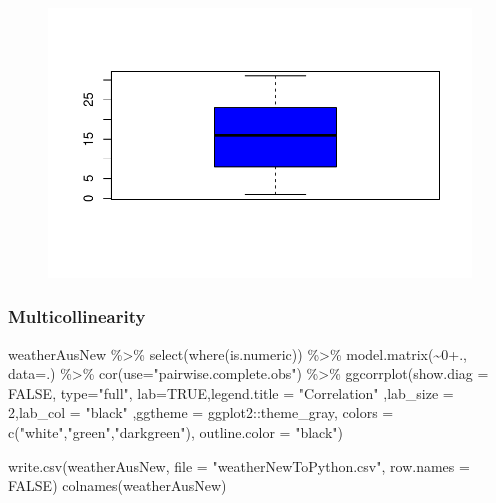 \documentclass[
  letterpaper,
  DIV=11,
  numbers=noendperiod]{scrartcl}
\newenvironment{Shaded}{\begin{snugshade}}{\end{snugshade}}
\newcommand{\AttributeTok}[1]{\textcolor[rgb]{0.40,0.45,0.13}{#1}}
\newcommand{\ConstantTok}[1]{\textcolor[rgb]{0.56,0.35,0.01}{#1}}
\newcommand{\DecValTok}[1]{\textcolor[rgb]{0.68,0.00,0.00}{#1}}
\newcommand{\FunctionTok}[1]{\textcolor[rgb]{0.28,0.35,0.67}{#1}}
\newcommand{\NormalTok}[1]{\textcolor[rgb]{0.00,0.23,0.31}{#1}}
\newcommand{\OtherTok}[1]{\textcolor[rgb]{0.00,0.23,0.31}{#1}}
\newcommand{\SpecialCharTok}[1]{\textcolor[rgb]{0.37,0.37,0.37}{#1}}
\newcommand{\StringTok}[1]{\textcolor[rgb]{0.13,0.47,0.30}{#1}}
\begin{document}
\begin{figure}[H]

{\centering \includegraphics{RainAus_EDA_files/figure-pdf/unnamed-chunk-28-1.pdf}

}

\end{figure}

\hypertarget{multicollinearity}{%
\subsubsection{Multicollinearity}\label{multicollinearity}}

\begin{Shaded}
\begin{Highlighting}[]
\NormalTok{weatherAusNew }\SpecialCharTok{\%\textgreater{}\%} \FunctionTok{select}\NormalTok{(}\FunctionTok{where}\NormalTok{(is.numeric)) }\SpecialCharTok{\%\textgreater{}\%} \FunctionTok{model.matrix}\NormalTok{(}\SpecialCharTok{\textasciitilde{}}\DecValTok{0}\SpecialCharTok{+}\NormalTok{.,}
              \AttributeTok{data=}\NormalTok{.) }\SpecialCharTok{\%\textgreater{}\%}
    \FunctionTok{cor}\NormalTok{(}\AttributeTok{use=}\StringTok{"pairwise.complete.obs"}\NormalTok{) }\SpecialCharTok{\%\textgreater{}\%} 
    \FunctionTok{ggcorrplot}\NormalTok{(}\AttributeTok{show.diag =} \ConstantTok{FALSE}\NormalTok{, }\AttributeTok{type=}\StringTok{"full"}\NormalTok{,}
               \AttributeTok{lab=}\ConstantTok{TRUE}\NormalTok{,}\AttributeTok{legend.title =} \StringTok{"Correlation"}\NormalTok{ ,lab\_size}
               \OtherTok{=} \DecValTok{2}\NormalTok{,}\AttributeTok{lab\_col =} \StringTok{"black"}\NormalTok{ ,}\AttributeTok{ggtheme =}
\NormalTok{                 ggplot2}\SpecialCharTok{::}\NormalTok{theme\_gray,}
               \AttributeTok{colors =} \FunctionTok{c}\NormalTok{(}\StringTok{"white"}\NormalTok{,}\StringTok{"green"}\NormalTok{,}\StringTok{"darkgreen"}\NormalTok{),}
               \AttributeTok{outline.color =} \StringTok{"black"}\NormalTok{)}

\FunctionTok{write.csv}\NormalTok{(weatherAusNew, }\AttributeTok{file =} \StringTok{"weatherNewToPython.csv"}\NormalTok{, }\AttributeTok{row.names =} \ConstantTok{FALSE}\NormalTok{)}
\FunctionTok{colnames}\NormalTok{(weatherAusNew)}
\end{Highlighting}
\end{Shaded}
\end{document}
